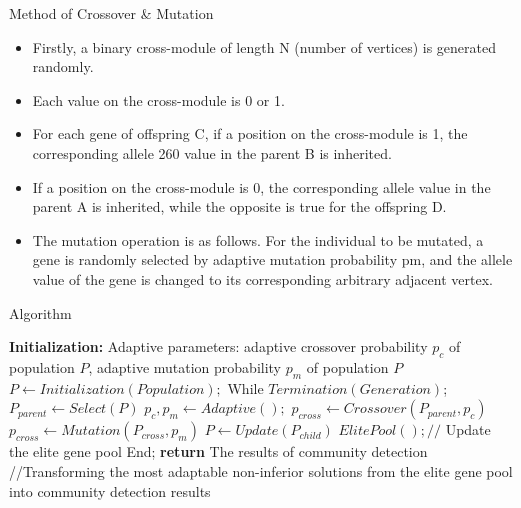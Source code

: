 \documentclass[aspectratio=169,xcolor=dvipsnames]{beamer}
\begin{document}
\begin{frame}{Method of Crossover \& Mutation}
\begin{itemize}
    \item Firstly, a binary cross-module of length N (number of vertices) is
generated randomly.
\item Each value on the cross-module is 0 or 1. 
\item For each gene of offspring C, if a position on the cross-module is 1, the corresponding allele
260 value in the parent B is inherited.
\item If a position on the cross-module is 0, the
corresponding allele value in the parent A is inherited, while the opposite is
true for the offspring D.
\item The mutation operation is as follows. For the individual to be mutated, a
gene is randomly selected by adaptive mutation probability pm, and the allele
value of the gene is changed to its corresponding arbitrary adjacent vertex.
\end{itemize}
   
\end{frame}


\begin{frame}{Algorithm}
    \begin{algorithm}[H]
        \begin{algorithmic}[1]
        \STATE \textbf{Initialization:} Adaptive parameters: adaptive crossover probability $p_{c}$ of
        population $P$, adaptive mutation probability $p_{m}$ of population $P$
        \STATE $P \leftarrow Initialization(Population);$
        \STATE While $Termination(Generation)$;
        \STATE $P_{parent} \leftarrow Select(P)$
        \STATE $p_{c}, p_{m} \leftarrow Adaptive();$
        \STATE $p_{cross} \leftarrow Crossover(P_{parent}, p_{c})$
        \STATE $p_{cross} \leftarrow Mutation(P_{cross}, p_{m})$
        \STATE $P \leftarrow Update(P_{child})$
        \STATE $ElitePool();//$ {Update the elite gene pool}
        \STATE End;
        \STATE \textbf{return} The results of community detection //{Transforming the most adaptable non-inferior solutions from the elite gene pool into community detection results}
        \end{algorithmic}
        \caption{Framework of F-SGCD Algorithm}
        \label{alg:seq}
    \end{algorithm}
\end{frame}

\end{document}
